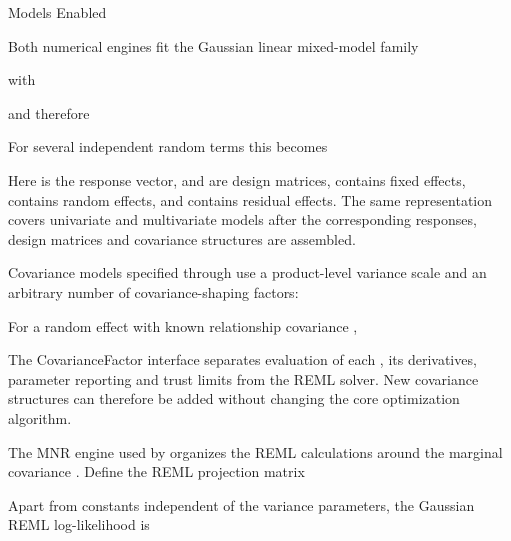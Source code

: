 \documentclass[a4paper]{book}
\begin{document}
\begin{Section}{Models Enabled}


Both numerical engines fit the Gaussian linear mixed-model family


with


and therefore


For several independent random terms this becomes


Here  is the response vector,  and  are design matrices,
\eqn{\beta}{} contains fixed effects,  contains random effects, and
 contains residual effects. The same representation covers univariate
and multivariate models after the corresponding responses, design matrices and
covariance structures are assembled.

Covariance models specified through  use a product-level
variance scale and an arbitrary number of covariance-shaping factors:


For a random effect with known relationship covariance ,


The CovarianceFactor interface separates evaluation of each , its
derivatives, parameter reporting and trust limits from the REML solver. New
covariance structures can therefore be added without changing the core
 optimization algorithm.


The MNR engine used by  organizes the REML calculations
around the marginal covariance . Define the REML projection matrix


Apart from constants independent of the variance parameters, the Gaussian REML
log-likelihood is



\end{Section}
\end{document}
